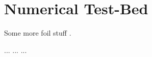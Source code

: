 \chapter{Numerical Test-Bed} \label{sec:test-bed}

Some more foil stuff \cite{Abbott1959}.

...
...
...

